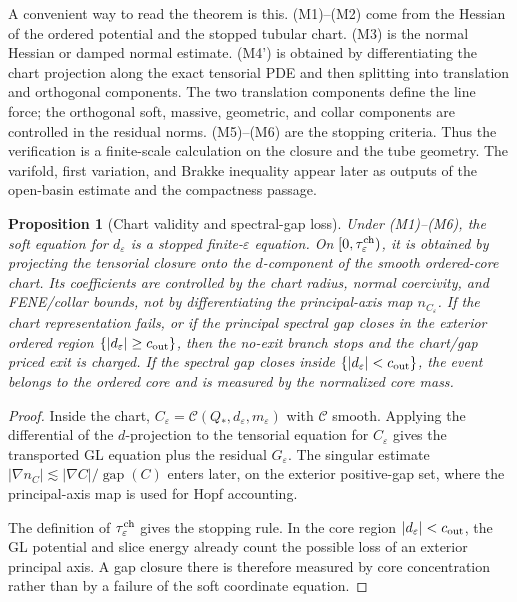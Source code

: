 \documentclass[11pt]{article}
\newtheorem{proposition}[theorem]{Proposition}
\theoremstyle{definition}
\newcommand{\eps}{\varepsilon}
\newcommand{\gap}{\operatorname{gap}}
\begin{document}
A convenient way to read the theorem is this.  (M1)--(M2) come from the
Hessian of the ordered potential and the stopped tubular chart.  (M3) is the
normal Hessian or damped normal estimate.  (M4') is obtained by differentiating
the chart projection along the exact tensorial PDE and then splitting into
translation and orthogonal components.  The two translation components define
the line force; the orthogonal soft, massive, geometric, and collar components
are controlled in the residual norms.  (M5)--(M6) are the stopping criteria.
Thus the verification is a finite-scale calculation on the closure and the tube
geometry.  The varifold, first variation, and Brakke inequality appear later as
outputs of the open-basin estimate and the compactness passage.

\begin{proposition}[Chart validity and spectral-gap loss]
\label{prop:chart-gap-validity}
Under (M1)--(M6), the soft equation for \(d_\eps\) is a stopped
finite-\(\eps\) equation.  On \([0,\tau_\eps^{\rm ch})\), it is obtained by
projecting the tensorial closure onto the \(d\)-component of the smooth
ordered-core chart.  Its coefficients are controlled by the chart radius,
normal coercivity, and FENE/collar bounds, not by differentiating the
principal-axis map \(n_{C_\eps}\).  If the chart representation fails, or if
the principal spectral gap closes in the exterior ordered region
\(\{|d_\eps|\ge c_{\rm out}\}\), then the no-exit branch stops and the
chart/gap priced exit is charged.  If the spectral gap closes inside
\(\{|d_\eps|<c_{\rm out}\}\), the event belongs to the ordered core and is
measured by the normalized core mass.
\end{proposition}

\begin{proof}
Inside the chart, \(C_\eps=\mathcal C(Q_\ast,d_\eps,m_\eps)\) with
\(\mathcal C\) smooth.  Applying the differential of the \(d\)-projection to
the tensorial equation for \(C_\eps\) gives the transported GL equation plus
the residual \(G_\eps\).  The singular estimate
\(|\nabla n_C|\lesssim |\nabla C|/\gap(C)\) enters later, on the exterior
positive-gap set, where the principal-axis map is used for Hopf accounting.

The definition of \(\tau_\eps^{\rm ch}\) gives the stopping rule.  In the core
region \(|d_\eps|<c_{\rm out}\), the GL potential and slice energy already
count the possible loss of an exterior principal axis.  A gap closure there is
therefore measured by core concentration rather than by a failure of the soft
coordinate equation.
\end{proof}
\end{document}
